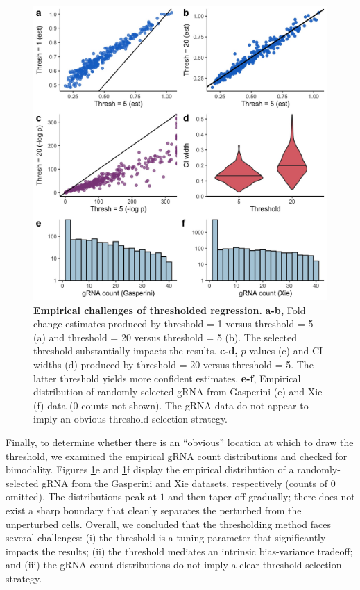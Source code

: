 \documentclass[12pt]{article}
\begin{document}
\begin{figure}[h!]
	\centering
	\includegraphics[width=1\linewidth]{figures/thresholding_empirical.jpeg}
	\caption{\textbf{Empirical challenges of thresholded regression.} \textbf{a-b,} Fold change estimates produced by threshold = 1 versus threshold = 5 (a) and threshold = 20 versus threshold = 5 (b). The selected threshold substantially impacts the results. \textbf{c-d,} $p$-values (c) and CI widths (d) produced by threshold = 20 versus threshold = 5. The latter threshold yields more confident estimates. \textbf{e-f}, Empirical distribution of randomly-selected gRNA from Gasperini (e) and Xie (f) data (0 counts not shown). The gRNA data do not appear to imply an obvious threshold selection strategy.}
	\label{thresholding_empirical}
\end{figure}

Finally, to determine whether there is an ``obvious'' location at which to draw the threshold, we examined the empirical gRNA count distributions and checked for bimodality. Figures \ref{thresholding_empirical}e and \ref{thresholding_empirical}f display the empirical distribution of a randomly-selected gRNA from the Gasperini and Xie datasets, respectively (counts of $0$ omitted). The distributions peak at $1$ and then taper off gradually; there does not exist a sharp boundary that cleanly separates the perturbed from the unperturbed cells. Overall, we concluded that the thresholding method faces several challenges: (i) the threshold is a tuning parameter that significantly impacts the results; (ii) the threshold mediates an intrinsic bias-variance tradeoff; and (iii) the gRNA count distributions do not imply a clear threshold selection strategy.
\end{document}
